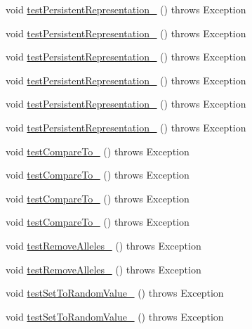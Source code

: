 \begin{DoxyCompactItemize}
\item 
void \hyperlink{classorg_1_1jgap_1_1impl_1_1_map_gene_test_a3f7483ed1862544483200c546c2f0405}{test\-Persistent\-Representation\-\_} ()  throws Exception 
\item 
void \hyperlink{classorg_1_1jgap_1_1impl_1_1_map_gene_test_a1cddaada86124996c52f6b8d377da67e}{test\-Persistent\-Representation\-\_} ()  throws Exception 
\item 
void \hyperlink{classorg_1_1jgap_1_1impl_1_1_map_gene_test_aea2f56e45427df3bbbc7d484849121bf}{test\-Persistent\-Representation\-\_} ()  throws Exception 
\item 
void \hyperlink{classorg_1_1jgap_1_1impl_1_1_map_gene_test_a3af6170b18646359e608a11e5c538681}{test\-Persistent\-Representation\-\_} ()  throws Exception 
\item 
void \hyperlink{classorg_1_1jgap_1_1impl_1_1_map_gene_test_a7edd1b284f12ca3522bb540d2d8f020f}{test\-Persistent\-Representation\-\_} ()  throws Exception 
\item 
void \hyperlink{classorg_1_1jgap_1_1impl_1_1_map_gene_test_a59cb249ed5e507fab6d3c552ebb29f50}{test\-Persistent\-Representation\-\_} ()  throws Exception 
\item 
void \hyperlink{classorg_1_1jgap_1_1impl_1_1_map_gene_test_ad13b264f3cef66c9cb223e97d71b044c}{test\-Compare\-To\-\_} ()  throws Exception 
\item 
void \hyperlink{classorg_1_1jgap_1_1impl_1_1_map_gene_test_a548bb5b895f35bac3492e7d8a521b7bf}{test\-Compare\-To\-\_} ()  throws Exception 
\item 
void \hyperlink{classorg_1_1jgap_1_1impl_1_1_map_gene_test_a2ac65ef5715e77180f2aa53862c3a9d1}{test\-Compare\-To\-\_} ()  throws Exception 
\item 
void \hyperlink{classorg_1_1jgap_1_1impl_1_1_map_gene_test_ab241ff461c072cd476021ea965180c59}{test\-Compare\-To\-\_} ()  throws Exception 
\item 
void \hyperlink{classorg_1_1jgap_1_1impl_1_1_map_gene_test_ab6c0cd54eb035dd82a007917bfe389b9}{test\-Remove\-Alleles\-\_} ()  throws Exception 
\item 
void \hyperlink{classorg_1_1jgap_1_1impl_1_1_map_gene_test_a6fa09c14b5b028c8106aba235e91ae65}{test\-Remove\-Alleles\-\_} ()  throws Exception 
\item 
void \hyperlink{classorg_1_1jgap_1_1impl_1_1_map_gene_test_a7c02a53a8930dc6240785629c6c340d7}{test\-Set\-To\-Random\-Value\-\_} ()  throws Exception 
\item 
void \hyperlink{classorg_1_1jgap_1_1impl_1_1_map_gene_test_a2c54e74d3962fa7877e32a8682ef0ef3}{test\-Set\-To\-Random\-Value\-\_} ()  throws Exception 
\end{DoxyCompactItemize}

